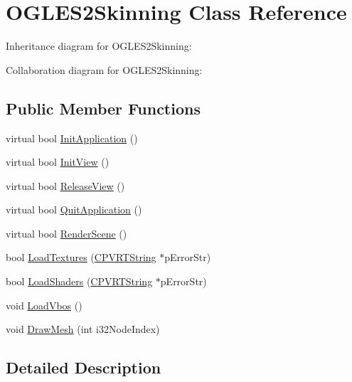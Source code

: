 \hypertarget{class_o_g_l_e_s2_skinning}{\section{O\+G\+L\+E\+S2\+Skinning Class Reference}
\label{class_o_g_l_e_s2_skinning}
}


Inheritance diagram for O\+G\+L\+E\+S2\+Skinning\+:


Collaboration diagram for O\+G\+L\+E\+S2\+Skinning\+:
\subsection*{Public Member Functions}
\begin{DoxyCompactItemize}
\item 
virtual bool \hyperlink{class_o_g_l_e_s2_skinning_a4c18c3aa42e634f32b7635d8e659870b}{Init\+Application} ()
\item 
virtual bool \hyperlink{class_o_g_l_e_s2_skinning_a5febe7726c2414aace25ee4141e5b227}{Init\+View} ()
\item 
virtual bool \hyperlink{class_o_g_l_e_s2_skinning_ab84c930538b2e11d018c9a65f81dd3ea}{Release\+View} ()
\item 
virtual bool \hyperlink{class_o_g_l_e_s2_skinning_a7302e67dfdaa0a806584a22d15e6ffed}{Quit\+Application} ()
\item 
virtual bool \hyperlink{class_o_g_l_e_s2_skinning_ae4c74f6b2934eb7ba613f76d2d88e5e1}{Render\+Scene} ()
\item 
bool \hyperlink{class_o_g_l_e_s2_skinning_a0f6327376c2ab894b36d1adedf374b9b}{Load\+Textures} (\hyperlink{class_c_p_v_r_t_string}{C\+P\+V\+R\+T\+String} $\ast$p\+Error\+Str)
\item 
bool \hyperlink{class_o_g_l_e_s2_skinning_a18c607ce390ab9c49a17e028e0358111}{Load\+Shaders} (\hyperlink{class_c_p_v_r_t_string}{C\+P\+V\+R\+T\+String} $\ast$p\+Error\+Str)
\item 
void \hyperlink{class_o_g_l_e_s2_skinning_a1bfc1f1b014f42867aec1196cb14072c}{Load\+Vbos} ()
\item 
void \hyperlink{class_o_g_l_e_s2_skinning_a9c47491f4698f01c1aec25676c309309}{Draw\+Mesh} (int i32\+Node\+Index)
\end{DoxyCompactItemize}


\subsection{Detailed Description}


